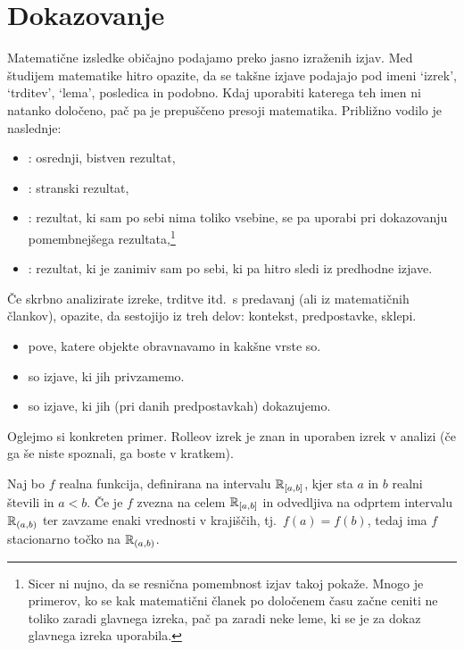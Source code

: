 \chapter{Dokazovanje}\label{poglavje:dokazovanje}

        Matematične izsledke običajno podajamo preko jasno izraženih izjav. Med študijem matematike hitro opazite, da se takšne izjave podajajo pod imeni `izrek', `trditev', `lema', {posledica} in podobno. Kdaj uporabiti katerega teh imen ni natanko določeno, pač pa je prepuščeno presoji matematika. Približno vodilo je naslednje:
        \begin{itemize}
                \item
                        : osrednji, bistven rezultat,
                \item
                        : stranski rezultat,
                \item
                        : rezultat, ki sam po sebi nima toliko vsebine, se pa uporabi pri dokazovanju pomembnejšega rezultata,\footnote{Sicer ni nujno, da se resnična pomembnost izjav takoj pokaže. Mnogo je primerov, ko se kak matematični članek po določenem času začne ceniti ne toliko zaradi glavnega izreka, pač pa zaradi neke leme, ki se je za dokaz glavnega izreka uporabila.}
                \item
                        : rezultat, ki je zanimiv sam po sebi, ki pa hitro sledi iz predhodne izjave.
        \end{itemize}

        Če skrbno analizirate izreke, trditve itd.~s predavanj (ali iz matematičnih člankov), opazite, da sestojijo iz treh delov: kontekst, predpostavke, sklepi.
        \begin{itemize}
                \item
                         pove, katere objekte obravnavamo in kakšne vrste so.
                \item
                         so izjave, ki jih privzamemo.
                \item
                         so izjave, ki jih (pri danih predpostavkah) dokazujemo.
        \end{itemize}

        Oglejmo si konkreten primer. Rolleov izrek je znan in uporaben izrek v analizi (če ga še niste spoznali, ga boste v kratkem).

        \begin{izrek}[Rolle]
                Naj bo $f$ realna funkcija, definirana na intervalu ${\mathbb{R}}_{[a, b]}$, kjer sta $a$ in $b$ realni števili in $a < b$. Če je $f$ zvezna na celem ${\mathbb{R}}_{[a, b]}$ in odvedljiva na odprtem intervalu ${\mathbb{R}}_{(a, b)}$ ter zavzame enaki vrednosti v krajiščih, tj.~$f(a) = f(b)$, tedaj ima $f$ stacionarno točko na ${\mathbb{R}}_{(a, b)}$.
        \end{izrek}

